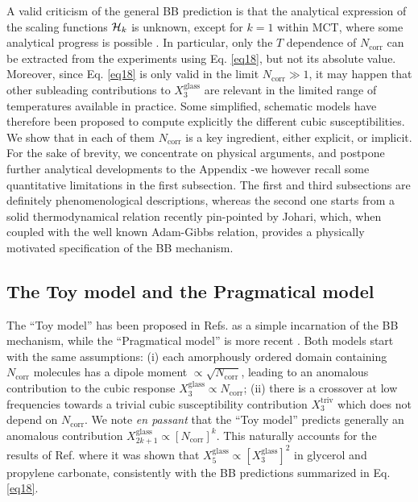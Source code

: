 \documentclass[single column,pre]{revtex4}
\begin{document}
A valid criticism of the general BB prediction is that the analytical expression of the scaling functions ${\cal H}_k$ is unknown, except for $k=1$ within MCT, where some analytical progress is possible \cite{Tar10}. In particular, only the $T$ dependence of $N_{\text{corr}}$ can be extracted from the experiments using Eq. \ref{eq18}, but not its absolute value. Moreover, since Eq. \ref{eq18} is only valid in the limit $N_{\text{corr}} \gg 1$, it may happen that other subleading contributions to $X_3^{\mathrm{glass}}$ are relevant in the limited range of temperatures available in practice. Some simplified, schematic models have therefore been proposed to compute explicitly the different cubic susceptibilities. 
We show that in each of them $N_{\text{corr}}$ is a key ingredient, either explicit, or implicit. For the sake of brevity, we concentrate on physical arguments, and postpone further analytical developments to the Appendix -we however recall some quantitative limitations in the first subsection. The first and third subsections are definitely phenomenological descriptions, whereas the second one starts from a solid thermodynamical relation recently pin-pointed by Johari, which, when coupled with the well known Adam-Gibbs relation, provides a physically motivated specification of the BB mechanism. 

\subsection{\label{part4-1} The Toy model and the Pragmatical model}

The ``Toy model'' has been proposed in Refs. \cite{Lad12,Lho14} as a simple incarnation of the BB mechanism, while the ``Pragmatical model'' is more recent \cite{Buc16a,Buc16b}. Both models start with the same assumptions: (i) each amorphously ordered domain containing $N_{\text{corr}}$ molecules has a dipole moment $\propto \sqrt{N_{\text{corr}}}$, leading to an anomalous contribution to the cubic response $X_{3}^{\mathrm{glass}} \propto N_{\text{corr}}$; (ii) there is a crossover at low frequencies towards a trivial cubic susceptibility 
contribution $X_{3}^{\mathrm{triv}}$ which does not depend on $N_{\text{corr}}$. We note \textit{en passant} that the ``Toy model'' predicts generally \cite{Lad12} an anomalous contribution $X_{2k+1}^{\mathrm{glass}} \propto [N_{\text{corr}}]^k$. This naturally accounts for the results of Ref. \cite{Alb16} where it was shown that $X_5^{\mathrm{glass}} \propto [X_3^{\mathrm{glass}}]^2$ in glycerol and propylene carbonate, consistently with the BB predictions summarized in Eq. \ref{eq18}. 
\end{document}
